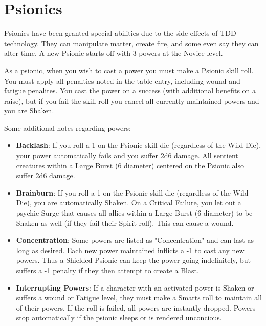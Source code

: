 \documentclass[10pt,twoside]{article}
\begin{document}
  \newpage


  \section{Psionics}

  \begin{multicols}{2}

  Psionics have been granted special abilities due to the side-effects of TDD technology. They can manipulate matter, create fire, and some even say they can alter time. A new Psionic starts off with 3 powers at the Novice level.

  As a psionic, when you wish to cast a power you must make a Psionic skill roll. You must apply all penalties noted in the table entry, including wound and fatigue penalites. You cast the power on a success (with additional benefits on a raise), but if you fail the skill roll you cancel all currently maintained powers and you are Shaken.

  Some additional notes regarding powers:

  \begin{itemize}

    \item \textbf{Backlash}: If you roll a 1 on the Psionic skill die (regardless of the Wild Die), your power automatically fails and you suffer 2d6 damage. All sentient creatures within a Large Burst (6 diameter) centered on the Psionic also suffer 2d6 damage.

    \item \textbf{Brainburn}: If you roll a 1 on the Psionic skill die (regardless of the Wild Die), you are automatically Shaken. On a Critical Failure, you let out a psychic Surge that causes all allies within a Large Burst (6 diameter) to be Shaken as well (if they fail their Spirit roll). This can cause a wound.

    \item \textbf{Concentration}: Some powers are listed as "Concentration" and can last as long as desired. Each new power maintained inflicts a -1 to cast any new powers. Thus a Shielded Psionic can keep the power going indefinitely, but suffers a -1 penalty if they then attempt to create a Blast.

    \item \textbf{Interrupting Powers}: If a character with an activated power is Shaken or suffers a wound or Fatigue level, they must make a Smarts roll to maintain all of their powers. If the roll is failed, all powers are instantly dropped. Powers stop automatically if the psionic sleeps or is rendered unconcious.


\end{itemize}
\end{multicols}
\end{document}
